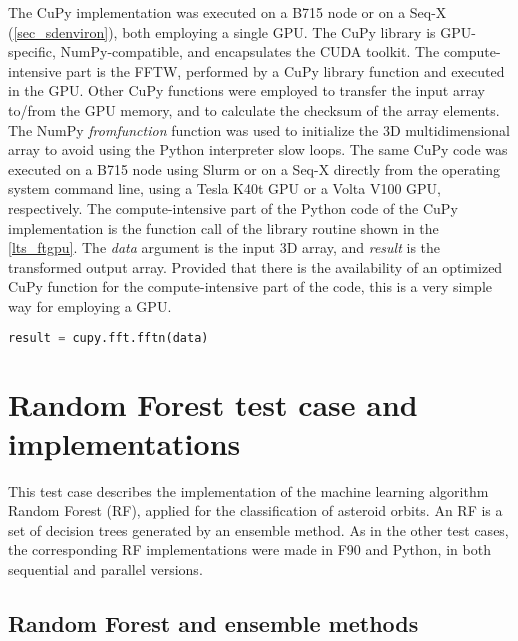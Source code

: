 The CuPy implementation was executed on a B715 node or on a Seq-X (\autoref {sec_sdenviron}), both employing a single GPU. The CuPy library is GPU-specific, NumPy-compatible, and encapsulates the CUDA toolkit. The compute-intensive part is the FFTW, performed by a CuPy library function and executed in the GPU. Other CuPy functions were employed to transfer the input array to/from the GPU memory, and to calculate the checksum of the array elements. The NumPy \textit {fromfunction} function was used to initialize the 3D multidimensional array to avoid using the Python interpreter slow loops. The same CuPy code was executed on a B715 node using Slurm or on a Seq-X directly from the operating system command line, using a Tesla K40t GPU or a Volta V100 GPU, respectively. The compute-intensive part of the Python code of the CuPy implementation is the function call of the library routine shown in the \autoref {lts_ftgpu}. The \textit {data} argument is the input 3D array, and \textit {result} is the transformed output array. Provided that there is the availability of an optimized CuPy function for the compute-intensive part of the code, this is a very simple way for employing a GPU.

\begin{lstlisting}[float=hbt, language=Python, label={lts_ftgpu}, caption={Compute-intensive part of the FFT test case CuPy code.}]
result = cupy.fft.fftn(data)
\end{lstlisting}

%
%
%
%
%
%
%
\section{Random Forest test case and implementations}
\label{sec_forest}

This test case describes the implementation of the machine learning algorithm Random Forest (RF), applied for the classification of asteroid orbits. An RF is a set of decision trees generated by an ensemble method. As in the other test cases, the corresponding RF implementations were made in F90 and Python, in both sequential and parallel versions. 

%
%
%
\subsection{Random Forest and ensemble methods} %

